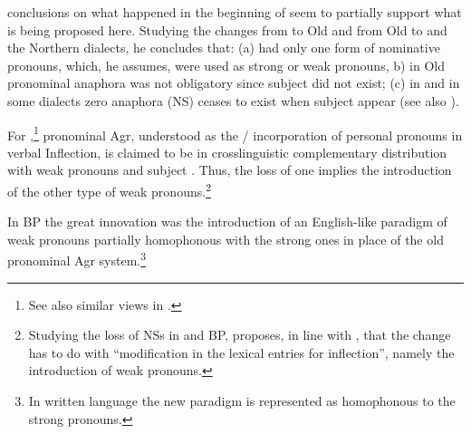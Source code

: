 \documentclass[output=paper]{langsci/langscibook}
\begin{document}
\ea\label{tree:fig2}
\z

 conclusions on what happened in the beginning of 
seem to partially support what is being proposed here. Studying the changes
from  to Old  and from Old  to  and the Northern
 dialects, he concludes that: (a)  had only one form of
nominative pronouns, which, he assumes, were used as strong or weak pronouns,
b) in Old  pronominal anaphora was not obligatory since subject 
did not exist; (c) in  and in some  dialects zero
anaphora  (NS) ceases to exist when subject  appear (see also
\citealt{Roberts1993}).

For \citet{Kato1999},\footnote{See also similar views in
\citet{Barbosa1995,AleAna1998,OrdonezTrevino1999}.} pronominal Agr, understood
as the  / incorporation of personal pronouns in verbal
Inflection, is claimed to be in crosslinguistic complementary distribution with
weak pronouns and subject . Thus, the loss of one implies the
introduction of the other type of weak pronouns.\footnote{Studying the loss of
    NSs in  and
\gls{BP}, \textcite[28]{Camacho2016} proposes, in
line with \citet{Kato1999}, that the change has to do with “modification in the
lexical entries for inflection”, namely the introduction of weak pronouns.}

In \gls{BP} the great innovation was the introduction
of an English-like paradigm of weak pronouns partially homophonous with the
strong ones \parencite{Nunes1990,Kato1999} in place of the old pronominal Agr
system.\footnote{In written language the new paradigm is represented as
homophonous to the strong pronouns.}
\end{document}
